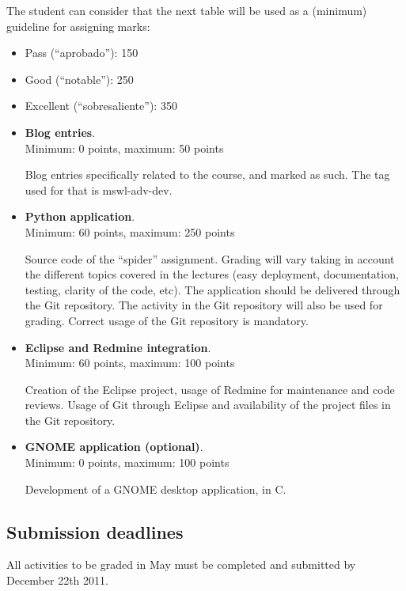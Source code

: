 \documentclass[a4paper]{article}
\begin{document}
The student can consider that the next table will be used as a
(minimum) guideline for assigning marks:

\begin{itemize}
\item Pass (``aprobado''): 150
\item Good (``notable''): 250
\item Excellent (``sobresaliente''): 350
\end{itemize}

\begin{itemize}
\item \textbf{Blog entries}. \\
  Minimum: 0 points, maximum: 50 points

  Blog entries specifically related to the course, and marked as such. The tag used for that is mswl-adv-dev.

\item \textbf{Python application}. \\
  Minimum: 60 points, maximum: 250 points

Source code of the ``spider'' assignment. Grading will vary taking in
account the different topics covered in the lectures (easy deployment,
documentation, testing, clarity of the code, etc). The application
should be delivered through the Git repository. The activity in the
Git repository will also be used for grading. Correct usage of the Git
repository is mandatory.

\item \textbf{Eclipse and Redmine integration}. \\
  Minimum: 60 points, maximum: 100 points

Creation of the Eclipse project, usage of Redmine for maintenance and
code reviews. Usage of Git through Eclipse and availability of the
project files in the Git repository.


\item \textbf{GNOME application (optional)}. \\
  Minimum: 0 points, maximum: 100 points

Development of a GNOME desktop application, in C.

\end{itemize}

\subsection{Submission deadlines}

All activities to be graded in May must be completed and submitted by December 22th 2011.
\end{document}
